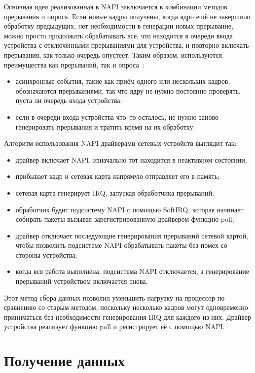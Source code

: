 Основная идея реализованная в NAPI заключается в комбинации методов прерывания и опроса. Если новые кадры получены, когда ядро ещё не завершило обработку предыдущих, нет необходимости в генерации новых прерывание, можно просто продолжать обрабатывать все, что находится в очереди ввода устройства с отключёнными прерываниями для устройства, и повторно включать прерывания, как только очередь опустеет. Таким образом,  используются преимущества как прерываний, так и опроса~\cite{net}:
\begin{itemize}[label=---]
	\item асинхронные события, такие как приём одного или нескольких кадров, обозначаются прерываниями, так что ядру не нужно постоянно проверять, пуста ли очередь входа устройства;
	\item если в очереди входа устройства что--то осталось, не нужно заново генерировать прерывания и тратить время на их обработку.
\end{itemize}

Алгоритм использования NAPI драйверами сетевых устройств выглядит так:
\begin{itemize}[label=---]
	\item драйвер включает NAPI, изначально тот находится в неактивном состоянии;
	\item прибывает кадр и сетевая карта напрямую отправляет его в память;
	\item сетевая карта генерирует IRQ, запуская обработчика прерываний;
	\item обработчик будит подсистему NAPI с помощью SoftIRQ, которая начинает собирать пакеты вызывая зарегистрированную драйвером функцию poll;
	\item драйвер отключает последующие генерирования прерываний сетевой картой, чтобы позволить подсистеме NAPI обрабатывать пакеты без помех со стороны устройства;
	\item когда вся работа выполнена, подсистема NAPI отключается, а генерирование прерываний устройством включается снова.
\end{itemize}

Этот метод сбора данных позволил уменьшить нагрузку на процессор по сравнению со старым методом, поскольку несколько кадров могут одновременно приниматься без необходимости генерирования IRQ для каждого из них. Драйвер устройства реализует функцию poll и регистрирует её с помощью NAPI.

\section{Получение данных}

